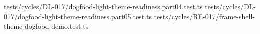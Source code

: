 \begin{itemize}
\allowbreak{}t\allowbreak{}e\allowbreak{}s\allowbreak{}t\allowbreak{}s\allowbreak{}/\allowbreak{}c\allowbreak{}y\allowbreak{}c\allowbreak{}l\allowbreak{}e\allowbreak{}s\allowbreak{}/\allowbreak{}D\allowbreak{}L\allowbreak{}-\allowbreak{}0\allowbreak{}1\allowbreak{}7\allowbreak{}/\allowbreak{}d\allowbreak{}o\allowbreak{}g\allowbreak{}f\allowbreak{}o\allowbreak{}o\allowbreak{}d\allowbreak{}-\allowbreak{}l\allowbreak{}i\allowbreak{}g\allowbreak{}h\allowbreak{}t\allowbreak{}-\allowbreak{}t\allowbreak{}h\allowbreak{}e\allowbreak{}m\allowbreak{}e\allowbreak{}-\allowbreak{}r\allowbreak{}e\allowbreak{}a\allowbreak{}d\allowbreak{}i\allowbreak{}n\allowbreak{}e\allowbreak{}s\allowbreak{}s\allowbreak{}.\allowbreak{}p\allowbreak{}a\allowbreak{}r\allowbreak{}t\allowbreak{}0\allowbreak{}4\allowbreak{}.\allowbreak{}t\allowbreak{}e\allowbreak{}s\allowbreak{}t\allowbreak{}.\allowbreak{}t\allowbreak{}s\allowbreak{} \allowbreak{}t\allowbreak{}e\allowbreak{}s\allowbreak{}t\allowbreak{}s\allowbreak{}/\allowbreak{}c\allowbreak{}y\allowbreak{}c\allowbreak{}l\allowbreak{}e\allowbreak{}s\allowbreak{}/\allowbreak{}D\allowbreak{}L\allowbreak{}-\allowbreak{}0\allowbreak{}1\allowbreak{}7\allowbreak{}/\allowbreak{}d\allowbreak{}o\allowbreak{}g\allowbreak{}f\allowbreak{}o\allowbreak{}o\allowbreak{}d\allowbreak{}-\allowbreak{}l\allowbreak{}i\allowbreak{}g\allowbreak{}h\allowbreak{}t\allowbreak{}-\allowbreak{}t\allowbreak{}h\allowbreak{}e\allowbreak{}m\allowbreak{}e\allowbreak{}-\allowbreak{}r\allowbreak{}e\allowbreak{}a\allowbreak{}d\allowbreak{}i\allowbreak{}n\allowbreak{}e\allowbreak{}s\allowbreak{}s\allowbreak{}.\allowbreak{}p\allowbreak{}a\allowbreak{}r\allowbreak{}t\allowbreak{}0\allowbreak{}5\allowbreak{}.\allowbreak{}t\allowbreak{}e\allowbreak{}s\allowbreak{}t\allowbreak{}.\allowbreak{}t\allowbreak{}s\allowbreak{} \allowbreak{}t\allowbreak{}e\allowbreak{}s\allowbreak{}t\allowbreak{}s\allowbreak{}/\allowbreak{}c\allowbreak{}y\allowbreak{}c\allowbreak{}l\allowbreak{}e\allowbreak{}s\allowbreak{}/\allowbreak{}R\allowbreak{}E\allowbreak{}-\allowbreak{}0\allowbreak{}1\allowbreak{}7\allowbreak{}/\allowbreak{}f\allowbreak{}r\allowbreak{}a\allowbreak{}m\allowbreak{}e\allowbreak{}-\allowbreak{}s\allowbreak{}h\allowbreak{}e\allowbreak{}l\allowbreak{}l\allowbreak{}-\allowbreak{}t\allowbreak{}h\allowbreak{}e\allowbreak{}m\allowbreak{}e\allowbreak{}-\allowbreak{}d\allowbreak{}o\allowbreak{}g\allowbreak{}f\allowbreak{}o\allowbreak{}o\allowbreak{}d\allowbreak{}-\allowbreak{}d\allowbreak{}e\allowbreak{}m\allowbreak{}o\allowbreak{}.\allowbreak{}t\allowbreak{}e\allowbreak{}s\allowbreak{}t\allowbreak{}.\allowbreak{}t\allowbreak{}s\allowbreak{} 
\end{itemize}
